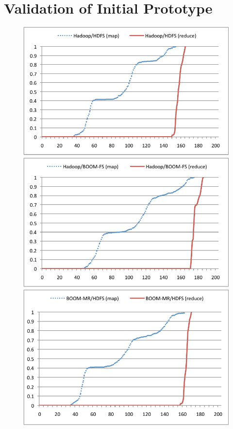 \section{Validation of Initial Prototype}
\label{app:experiment}
\begin{figure}[t]
\begin{minipage}{0.5\linewidth}
        \includegraphics[width=0.95\linewidth]{graphs/hadoop_hdfs}
\end{minipage}
\begin{minipage}{0.5\linewidth}
        \includegraphics[width=0.95\linewidth]{graphs/hadoop_bfs}
\end{minipage}
\begin{minipage}{0.5\linewidth}
        \includegraphics[width=0.95\linewidth]{graphs/bmr_hdfs}

\end{minipage}
\end{figure}
